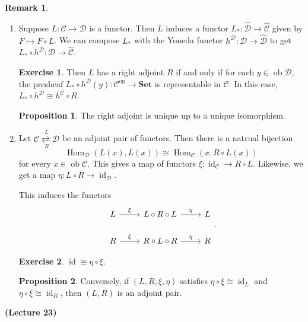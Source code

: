 \documentclass[10pt,letterpaper,cm]{nupset}
\theoremstyle{definition}
\newtheorem{remark}{Remark}
\newtheorem{prop}{Proposition}
\newtheorem{exercise}{Exercise}
\newcommand{\1}{\mathbf{1}}
\renewcommand{\c}{\mathscr{C}}
\renewcommand{\d}{\mathscr{D}}
\newcommand{\0}{\vec 0}
\DeclareMathOperator{\id}{id}
\DeclareMathOperator{\op}{op}
\DeclareMathOperator{\ob}{ob}
\DeclareMathOperator{\Hom}{Hom}
\begin{document}
\begin{remark} $ $
\begin{enumerate}
\item Suppose $L : \c \to \d$ is a functor. Then $L$ induces a functor $L_{\ast} : \widehat{\d} \to \widehat{\c}$ given by $F \mapsto F \circ L$. We can compose $L_{\ast}$ with the Yoneda functor $h^{\d} : \d \to \widehat{\d}$ to get $L_{\ast} \circ h^{\d} : \d \to \widehat{\c}$. 
\begin{exercise} Then $L$ has a right adjoint $R$  if and only if for each $y \in \ob \d$, the presheaf $L_{\ast} \circ h^{\d}(y) : \c^{\op} \to \mathbf{Set}$ is representable in $\c$. In this case, $L_{\ast} \circ h^{\d} \cong h^{\c} \circ R$.
\end{exercise}
\begin{prop}
The right adjoint is unique up to a unique isomorphism.
\end{prop}
\item Let $\overset{L}{\underset{R}{\c \rightleftarrows \d}}$ be an adjoint pair of functors. Then there is a natrual bijection $$\Hom_{\d}(L(x), L(x)) \cong \Hom_{\c}(x, R \circ L(x))$$ for every $x\in \ob \c$. This gives a map of functors $\xi : \id_{\c} \to R \circ L$. Likewise, we get a map $\eta : L \circ R \to \id_{\d}$.

This induces the functors 
\[
\begin{tikzcd}
L \arrow[r, "\xi"] & L \circ R \circ L \arrow[r, "\eta"] & L \\
R \arrow[r, "\xi"] & R\circ L \circ R \arrow[r, "\eta"] & R
\end{tikzcd}
.\]
\begin{exercise}
$\id \cong \eta \circ \xi$.
\end{exercise}
\begin{prop}
Conversely, if $(L, R, \xi, \eta)$ satisfies $\eta \circ \xi \cong \id_L$ and $\eta \circ \xi \cong \id_R$, then $(L, R)$ is an adjoint pair.
\end{prop}
\end{enumerate}
\end{remark}

\begin{center}
{\textbf{(Lecture 23)}}
\end{center}
\end{document}
